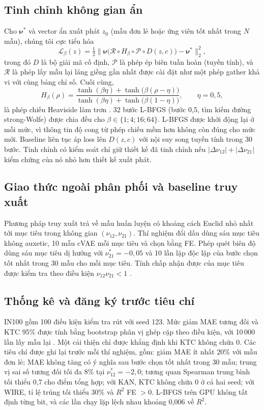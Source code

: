 \documentclass[a4paper,11pt]{article}
\newcommand{\nuot}{\nu_{12}}
\newcommand{\nuto}{\nu_{21}}
\newcommand{\RR}{R^2}
\begin{document}
\subsection{Tinh chỉnh không gian ẩn}
Cho $\boldsymbol\nu^{*}$ và vector ẩn xuất phát $z_0$ (mẫu đơn lẻ hoặc ứng
viên tốt nhất trong $N$ mẫu), chúng tôi cực tiểu hóa
\begin{equation}
\mathcal L_\beta(z)=\tfrac12\bigl\lVert
\boldsymbol\nu\bigl(\mathcal R\circ H_\beta\circ\mathcal P\circ D(z,c)\bigr)
-\boldsymbol\nu^{*}\bigr\rVert_2^2 ,
\end{equation}
trong đó $D$ là bộ giải mã cố định, $\mathcal P$ là phép ép biên tuần hoàn
(tuyến tính), và $\mathcal R$ là phép lấy mẫu lại láng giềng gần nhất được
cài đặt như một phép gather khả vi với cùng bảng chỉ số. Cuối cùng,
\begin{equation}
H_\beta(\rho)=\frac{\tanh(\beta\eta)+\tanh\bigl(\beta(\rho-\eta)\bigr)}
{\tanh(\beta\eta)+\tanh\bigl(\beta(1-\eta)\bigr)},\qquad \eta=0{,}5,
\end{equation}
là phép chiếu Heaviside làm trơn \citep{wang2011projection}. 32 bước L-BFGS
(bước 0,5, tìm kiếm đường strong-Wolfe) được chia đều cho
$\beta\in\{1;4;16;64\}$. L-BFGS được khởi động lại ở mỗi mức, vì thông tin độ
cong từ phép chiếu mềm hơn không còn đúng cho mức mới. Baseline liên tục áp
loss lên $D(z,c)$ với nội suy song tuyến tính trong 30 bước. Tinh chỉnh có
kiểm soát chỉ giữ thiết kế đã tinh chỉnh nếu $|\Delta\nuot|+|\Delta\nuto|$
kiểm chứng của nó nhỏ hơn thiết kế xuất phát.

\subsection{Giao thức ngoài phân phối và baseline truy xuất}
Phương pháp truy xuất trả về mẫu huấn luyện có khoảng cách Euclid nhỏ nhất
tới mục tiêu trong không gian $(\nuot,\nuto)$. Thí nghiệm đổi dấu dùng sáu
mục tiêu không auxetic, 10 mẫu cVAE mỗi mục tiêu và chọn bằng FE. Phép quét
biên độ dùng sáu mục tiêu dị hướng với $\nuto^{*}=-0{,}05$ và 10 lần lặp độc
lập của bước chọn tốt nhất trong 30 mẫu cho mỗi mục tiêu. Tính chấp nhận
được của mục tiêu được kiểm tra theo điều kiện $\nuot\nuto<1$
\citep{lempriere1968poisson}.

\subsection{Thống kê và đăng ký trước tiêu chí}
IN100 gồm 100 điều kiện kiểm tra rút với seed 123. Mức giảm MAE tương đối và
KTC 95\% được tính bằng bootstrap phân vị ghép cặp theo điều kiện, với
10\,000 lần lấy mẫu lại \citep{efron1993bootstrap}. Một cải thiện chỉ được
khẳng định khi KTC không chứa 0. Các tiêu chí được ghi lại trước mỗi thí
nghiệm, gồm: giảm MAE ít nhất 20\% với mẫu đơn lẻ; MAE không tăng có ý nghĩa
sau bước chọn tốt nhất trong 30 mẫu; trung vị sai số tương đối tối đa 8\%
tại $\nuot^{*}=-2{,}0$; tương quan Spearman trung bình tối thiểu 0,7 cho điểm
tổng hợp; với KAN, KTC không chứa 0 ở cả hai seed; với WIRE, tỉ lệ trúng tối
thiểu 30\% và $\RR$ FE $>0$. L-BFGS trên GPU không tất định từng bit, và các
lần chạy lặp lệch nhau khoảng 0,006 về $\RR$.
\end{document}
